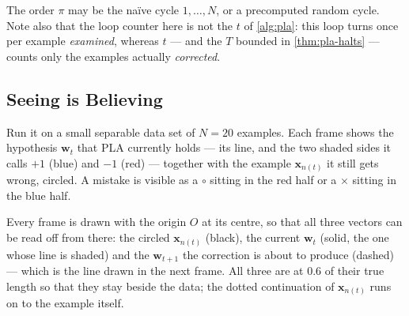 The order \(\pi\) may be the naïve cycle \(1, \dots , N\), or a precomputed
random cycle. Note also that the loop counter here is not the \(t\) of
\autoref{alg:pla}: this loop turns once per example \emph{examined}, whereas
\(t\) --- and the \(T\) bounded in \autoref{thm:pla-halts} --- counts only the
examples actually \emph{corrected}.

\subsection{Seeing is Believing}

Run it on a small separable data set of \(N = 20\) examples. Each frame shows
the hypothesis \(\bm{w}_t\) that PLA currently holds --- its line, and the two
shaded sides it calls \(+1\) (blue) and \(-1\) (red) --- together with the
example \(\bm{x}_{n(t)}\) it still gets wrong, circled. A mistake is visible as
a \(\circ\) sitting in the red half or a \(\times\) sitting in the blue half.

Every frame is drawn with the origin \(O\) at its centre, so that all three
vectors can be read off from there: the circled \(\bm{x}_{n(t)}\) (black), the
current \(\bm{w}_t\) (solid, the one whose line is shaded) and the
\(\bm{w}_{t+1}\) the correction is about to produce (dashed) --- which is the
line drawn in the next frame. All three are at \(0.6\) of their true length so
that they stay beside the data; the dotted continuation of \(\bm{x}_{n(t)}\)
runs on to the example itself.

